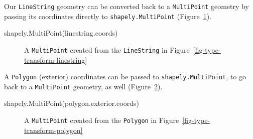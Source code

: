 \documentclass[
  letterpaper,
]{krantz}
\newenvironment{Shaded}{\begin{snugshade}}{\end{snugshade}}
\newcommand{\NormalTok}[1]{\textcolor[rgb]{0.00,0.23,0.31}{#1}}
\begin{document}
Our \texttt{\textquotesingle{}LineString\textquotesingle{}} geometry can
be converted back to a
\texttt{\textquotesingle{}MultiPoint\textquotesingle{}} geometry by
passing its coordinates directly to \texttt{shapely.MultiPoint}
(Figure~\ref{fig-type-transform-multipoint2}).

\begin{Shaded}
\begin{Highlighting}[]
\NormalTok{shapely.MultiPoint(linestring.coords)}
\end{Highlighting}
\end{Shaded}

\begin{figure}[H]


\caption{\label{fig-type-transform-multipoint2}A
\texttt{\textquotesingle{}MultiPoint\textquotesingle{}} created from the
\texttt{\textquotesingle{}LineString\textquotesingle{}} in
Figure~\ref{fig-type-transform-linestring}}

\end{figure}%

A \texttt{\textquotesingle{}Polygon\textquotesingle{}} (exterior)
coordinates can be passed to \texttt{shapely.MultiPoint}, to go back to
a \texttt{\textquotesingle{}MultiPoint\textquotesingle{}} geometry, as
well (Figure~\ref{fig-type-transform-polygon2}).

\begin{Shaded}
\begin{Highlighting}[]
\NormalTok{shapely.MultiPoint(polygon.exterior.coords)}
\end{Highlighting}
\end{Shaded}

\begin{figure}[H]


\caption{\label{fig-type-transform-polygon2}A
\texttt{\textquotesingle{}MultiPoint\textquotesingle{}} created from the
\texttt{\textquotesingle{}Polygon\textquotesingle{}} in
Figure~\ref{fig-type-transform-polygon}}

\end{figure}%
\end{document}
